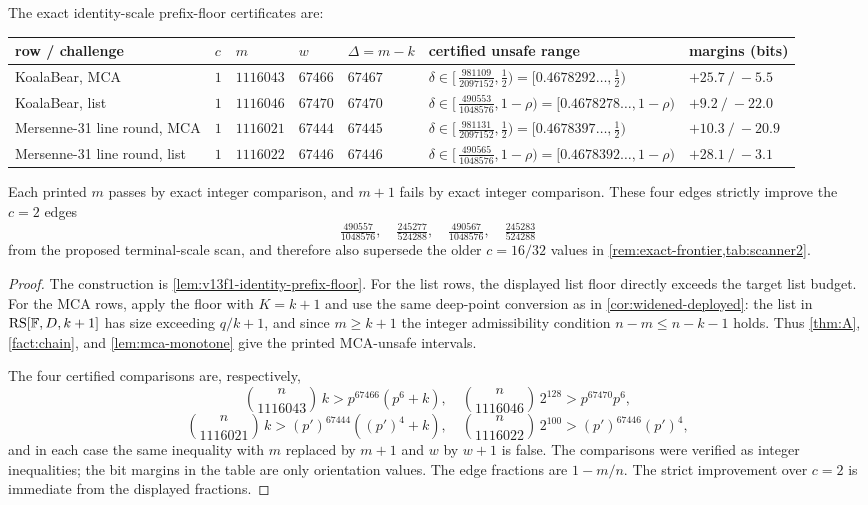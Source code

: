 \begin{proposition}\label{prop:v13f1-identity-frontier}
The exact identity-scale prefix-floor certificates are:
\begin{center}\footnotesize
\begin{tabular}{@{}lllllll@{}}
\toprule
row / challenge & $c$ & $m$ & $w$ & $\Delta=m-k$ & certified unsafe range & margins (bits)\\
\midrule
KoalaBear, MCA & $1$ & $1116043$ & $67466$ & $67467$ & $\delta\in[\,\tfrac{981109}{2097152},\tfrac12)=[0.4678292\ldots,\tfrac12)$ & $+25.7\ /\ -5.5$\\
KoalaBear, list & $1$ & $1116046$ & $67470$ & $67470$ & $\delta\in[\,\tfrac{490553}{1048576},1-\rho)=[0.4678278\ldots,1-\rho)$ & $+9.2\ /\ -22.0$\\
Mersenne-31 line round, MCA & $1$ & $1116021$ & $67444$ & $67445$ & $\delta\in[\,\tfrac{981131}{2097152},\tfrac12)=[0.4678397\ldots,\tfrac12)$ & $+10.3\ /\ -20.9$\\
Mersenne-31 line round, list & $1$ & $1116022$ & $67446$ & $67446$ & $\delta\in[\,\tfrac{490565}{1048576},1-\rho)=[0.4678392\ldots,1-\rho)$ & $+28.1\ /\ -3.1$\\
\bottomrule
\end{tabular}
\end{center}
Each printed $m$ passes by exact integer comparison, and $m+1$ fails by exact integer comparison.  These four edges strictly improve the $c=2$ edges
\[
\tfrac{490557}{1048576},\quad
\tfrac{245277}{524288},\quad
\tfrac{490567}{1048576},\quad
\tfrac{245283}{524288}
\]
from the proposed terminal-scale scan, and therefore also supersede the older $c=16/32$ values in \cref{rem:exact-frontier,tab:scanner2}.
\end{proposition}

\begin{proof}
The construction is \cref{lem:v13f1-identity-prefix-floor}.  For the list rows, the displayed list floor directly exceeds the target list budget.  For the MCA rows, apply the floor with $K=k+1$ and use the same deep-point conversion as in \cref{cor:widened-deployed}: the list in $\mathrm{RS}[\mathbb F,D,k+1]$ has size exceeding $q/k+1$, and since $m\ge k+1$ the integer admissibility condition $n-m\le n-k-1$ holds.  Thus \cref{thm:A}, \cref{fact:chain}, and \cref{lem:mca-monotone} give the printed MCA-unsafe intervals.

The four certified comparisons are, respectively,
\[
\binom n{1116043}\,k>p^{67466}(p^6+k),\quad
\binom n{1116046}\,2^{128}>p^{67470}p^6,
\]
\[
\binom n{1116021}\,k>(p')^{67444}((p')^4+k),\quad
\binom n{1116022}\,2^{100}>(p')^{67446}(p')^4,
\]
and in each case the same inequality with $m$ replaced by $m+1$ and $w$ by $w+1$ is false.  The comparisons were verified as integer inequalities; the bit margins in the table are only orientation values.  The edge fractions are $1-m/n$.  The strict improvement over $c=2$ is immediate from the displayed fractions.
\end{proof}

